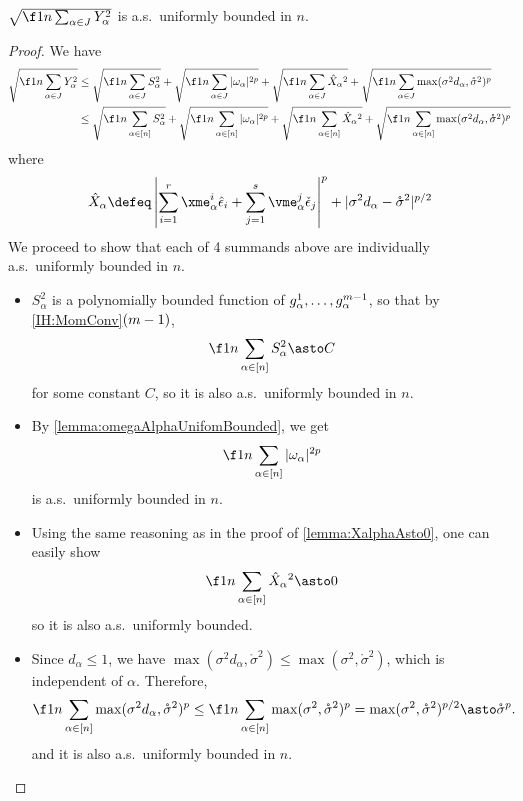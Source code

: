 \documentclass[main.tex]{subfiles}
\begin{document}
\begin{lemma}\label{lemma:YAlphaUnifBounded}
$\sqrt{\f 1 n \sum_{\alpha \in \JJc} Y_\alpha^2}$ is a.s.\ uniformly bounded in $n$.
\end{lemma}
\begin{proof}
  \newcommand{\XX}{\hat{X}}
  We have
  \begin{align*}
  \sqrt{\f 1 n \sum_{\alpha \in \JJc} Y_\alpha^2}
      &\le
          \sqrt{\f 1 n \sum_{\alpha \in \JJc} S_\alpha^2}
          + \sqrt{\f 1 n \sum_{\alpha \in \JJc} |\omega_\alpha|^{2p}}
          + \sqrt{\f 1 n \sum_{\alpha \in \JJc} \XX_\alpha{}^2}
          + \sqrt{\f 1 n \sum_{\alpha \in \JJc} \max(\sigma^2 d_\alpha, \mathring \sigma^2)^p}
          \\
      &\le
          \sqrt{\f 1 n \sum_{\alpha \in [n]} S_\alpha^2}
          + \sqrt{\f 1 n \sum_{\alpha \in [n]} |\omega_\alpha|^{2p}}
          + \sqrt{\f 1 n \sum_{\alpha \in [n]} \XX_\alpha{}^2}
          + \sqrt{\f 1 n \sum_{\alpha \in [n]} \max(\sigma^2 d_\alpha, \mathring \sigma^2)^p}
  \end{align*}
  where
  \[\XX_\alpha \defeq \left|\sum_{i=1}^r \xme_\alpha^i \hat \epsilon_i
                  + \sum_{j=1}^s \vme_\alpha^j \check \epsilon_j
          \right|^p
          + |\sigma^2 d_\alpha - \mathring \sigma^2|^{p/2}
  \]
  We proceed to show that each of 4 summands above are individually a.s.\ uniformly bounded in $n$.
  \begin{itemize}
  \item
      $S_\alpha^2$ is a polynomially bounded function of $g^1_\alpha, \ldots, g^{m-1}_\alpha$, so that by \ref{IH:MomConv}$(m-1)$,
      \[\f 1 n \sum_{\alpha \in [n]} S_\alpha^2 \asto C\]
      for some constant $C$, so it is also a.s.\ uniformly bounded in $n$.
  \item
      By \cref{lemma:omegaAlphaUnifomBounded}, we get
      \begin{equation*}
      \f 1 n \sum_{\alpha \in [n]} |\omega_\alpha|^{2p}
      \end{equation*}
      is a.s.\ uniformly bounded in $n$.
  \item
      Using the same reasoning as in the proof of \cref{lemma:XalphaAsto0}, one can easily show
      \[
      \f 1 n \sum_{\alpha \in [n]} \XX_\alpha{}^2 \asto 0
      \]
      so it is also a.s.\ uniformly bounded. 
  \item
      Since $d_\alpha \le 1$, we have $\max(\sigma^2 d_\alpha, \mathring\sigma^2) \le \max(\sigma^2, \mathring \sigma^2)$, which is independent of $\alpha$.
      Therefore,
      \begin{align*}
      \f 1 n \sum_{\alpha \in [n]} \max(\sigma^2 d_\alpha, \mathring \sigma^2)^p
      &\le
          \f 1 n \sum_{\alpha \in [n]} \max(\sigma^2, \mathring \sigma^2)^p
      =
          \max(\sigma^2, \mathring \sigma^2)^{p/2}
      \asto \mathring \sigma^p.
      \end{align*}
      and it is also a.s.\ uniformly bounded in $n$.
  \end{itemize}
  
  
\end{proof}
  
\end{document}
